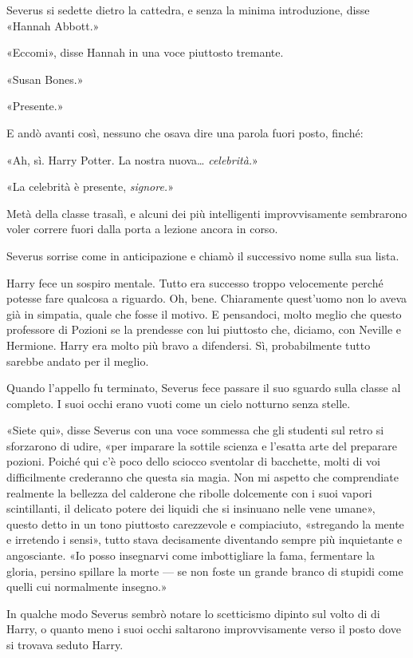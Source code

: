 Severus si sedette dietro la cattedra, e senza la minima introduzione, disse «Hannah Abbott.»

«Eccomi», disse Hannah in una voce piuttosto tremante.

«Susan Bones.»

«Presente.»

E andò avanti così, nessuno che osava dire una parola fuori posto, finché:

«Ah, sì. Harry Potter. La nostra nuova… \textit{celebrità.}»

«La celebrità è presente, \textit{signore.}»

Metà della classe trasalì, e alcuni dei più intelligenti improvvisamente sembrarono voler correre fuori dalla porta a lezione ancora in corso.

Severus sorrise come in anticipazione e chiamò il successivo nome sulla sua lista.

Harry fece un sospiro mentale. Tutto era successo troppo velocemente perché potesse fare qualcosa a riguardo. Oh, bene. Chiaramente quest’uomo non lo aveva già in simpatia, quale che fosse il motivo. E pensandoci, molto meglio che questo professore di Pozioni se la prendesse con lui piuttosto che, diciamo, con Neville e Hermione. Harry era molto più bravo a difendersi. Sì, probabilmente tutto sarebbe andato per il meglio.

Quando l’appello fu terminato, Severus fece passare il suo sguardo sulla classe al completo. I suoi occhi erano vuoti come un cielo notturno senza stelle.

«Siete qui», disse Severus con una voce sommessa che gli studenti sul retro si sforzarono di udire, «per imparare la sottile scienza e l’esatta arte del preparare pozioni. Poiché qui c’è poco dello sciocco sventolar di bacchette, molti di voi difficilmente crederanno che questa sia magia. Non mi aspetto che comprendiate realmente la bellezza del calderone che ribolle dolcemente con i suoi vapori scintillanti, il delicato potere dei liquidi che si insinuano nelle vene umane», questo detto in un tono piuttosto carezzevole e compiaciuto, «stregando la mente e irretendo i sensi», tutto stava decisamente diventando sempre più inquietante e angosciante. «Io posso insegnarvi come imbottigliare la fama, fermentare la gloria, persino spillare la morte — se non foste un grande branco di stupidi come quelli cui normalmente insegno.»

In qualche modo Severus sembrò notare lo scetticismo dipinto sul volto di di Harry, o quanto meno i suoi occhi saltarono improvvisamente verso il posto dove si trovava seduto Harry.

